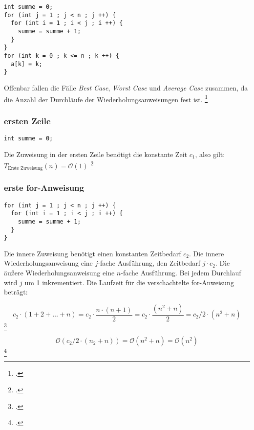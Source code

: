 \documentclass{bschlangaul-theorie}
\begin{document}
\begin{verbatim}
int summe = 0;
for (int j = 1 ; j < n ; j ++) {
  for (int i = 1 ; i < j ; i ++) {
    summe = summe + 1;
  }
}
for (int k = 0 ; k <= n ; k ++) {
  a[k] = k;
}
\end{verbatim}

\noindent
Offenbar fallen die Fälle \emph{Best Case}, \emph{Worst Case} und
\emph{Average Case} zusammen, da die Anzahl der Durchläufe der
Wiederholungsanweisungen fest ist.
\footcite[Seite 27 (PDF 19)]{aud:fs:2}

%

\subsubsection{ersten Zeile}

\begin{verbatim}
int summe = 0;
\end{verbatim}

\noindent
Die Zuweisung in der ersten Zeile benötigt die konstante Zeit $c_1$,
also gilt: $T_{\text{Erste Zuweisung}}(n) = \mathcal{O}(1)$
\footcite[Seite 28 (PDF 20)]{aud:fs:2}

%

\subsubsection{erste for-Anweisung}

\begin{verbatim}
for (int j = 1 ; j < n ; j ++) {
  for (int i = 1 ; i < j ; i ++) {
    summe = summe + 1;
  }
}
\end{verbatim}

\noindent
Die innere Zuweisung benötigt einen konstanten Zeitbedarf $c_2$. Die
innere Wiederholungsanweisung eine $j$-fache Ausführung, \dh den
Zeitbedarf $j \cdot c_2$. Die äußere Wiederholungsanweisung eine
$n$-fache Ausführung. Bei jedem Durchlauf wird $j$ um 1 inkrementiert.
Die Laufzeit für die verschachtelte for-Anweisung beträgt:

\begin{displaymath}
c_2 \cdot (1 + 2 + \ldots + n) =
c_2 \cdot \frac{n \cdot (n + 1) }{2} =
c_2 \cdot \frac{(n^2 + n)}{2} =
c_2 / 2 \cdot (n^2 + n)
\end{displaymath}
\footcite{wiki:gausssche-summenformel}

\begin{displaymath}
\mathcal{O}(c_2 / 2 \cdot (n_2 + n)) =
\mathcal{O}(n^2 + n) =
\mathcal{O}(n^2)
\end{displaymath}
\footcite[Seite 29 (PDF 21)]{aud:fs:2}
\end{document}
